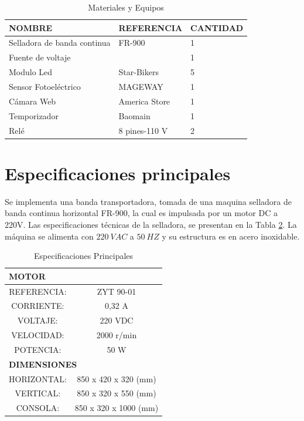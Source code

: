\begin{table}[ht]
	\centering
	\begin{tabular}{|p{5cm}|p{3.5cm}|p{2.5cm}|}
		\hline
		NOMBRE & REFERENCIA & CANTIDAD \\ 
		\hline
		Selladora de banda continua & FR-900 & 1 \\
		\hline
		Fuente de voltaje &  & 1 \\
		\hline
		Modulo Led & Star-Bikers & 5 \\
		\hline
		Sensor Fotoeléctrico & MAGEWAY & 1 \\
		\hline
		Cámara Web & America Store & 1 \\
		\hline
		Temporizador & Baomain  & 1 \\
		\hline
		Relé & 8 pines-110 V & 2 \\
		\hline
	\end{tabular}	
	\caption{Materiales y Equipos}
	\label{table:materiales}
\end{table}	


\section{Especificaciones principales}
Se implementa una banda transportadora, tomada de una maquina selladora de banda continua horizontal FR-900, la cual es impulsada por un motor DC a 220V. Las especificaciones técnicas de la selladora, se presentan en la Tabla \ref{fig:principales}. La máquina se alimenta con $220 \ VAC$ a $50 \ HZ$ y su estructura es en acero inoxidable. 

\begin{table}[ht]
	\centering
	\begin{tabular}{|c|c|c|c|}
		\hline
		\multicolumn{4}{|l|}{\textbf{MOTOR}} \bigstrut\\
		\hline
		\multicolumn{2}{|c|}{REFERENCIA:} & \multicolumn{2}{c|}{ZYT 90-01} \bigstrut\\
		\hline
		\multicolumn{2}{|c|}{CORRIENTE:} & \multicolumn{2}{c|}{0,32 A} \bigstrut\\
		\hline
		\multicolumn{2}{|c|}{VOLTAJE:} & \multicolumn{2}{c|}{220 VDC} \bigstrut\\
		\hline
		\multicolumn{2}{|c|}{VELOCIDAD:} & \multicolumn{2}{c|}{2000 r/min} \bigstrut\\
		\hline
		\multicolumn{2}{|c|}{POTENCIA:} & \multicolumn{2}{c|}{50 W} \bigstrut\\
		\hline
		\multicolumn{4}{|l|}{\textbf{DIMENSIONES}} \bigstrut\\
		\hline
		\multicolumn{2}{|c|}{HORIZONTAL:} & \multicolumn{2}{c|}{850 x 420 x 320 (mm)} \bigstrut\\
		\hline
		\multicolumn{2}{|c|}{VERTICAL:} & \multicolumn{2}{c|}{850 x 320 x 550 (mm)} \bigstrut\\
		\hline
		\multicolumn{2}{|c|}{CONSOLA:} & \multicolumn{2}{c|}{850 x 320 x 1000 (mm)} \bigstrut\\
		\hline
	\end{tabular}%
	\caption{Especificaciones Principales}
	\label{fig:principales}
\end{table}%


